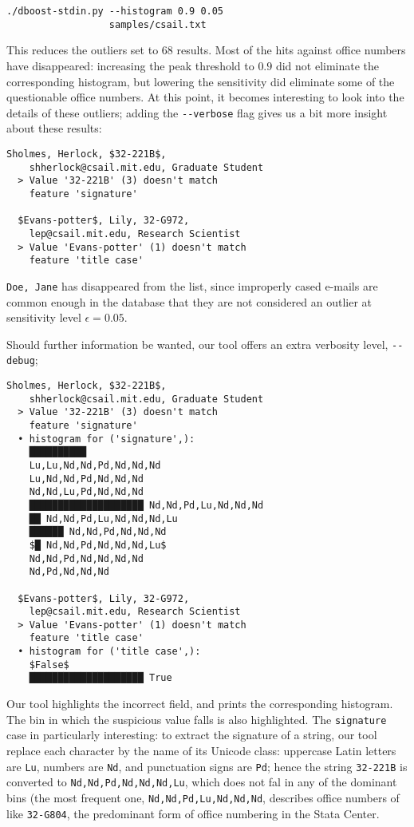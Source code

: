 \begin{lstlisting}[gobble=2]
./dboost-stdin.py --histogram 0.9 0.05 
                  samples/csail.txt
\end{lstlisting}

This reduces the outliers set to $68$ results. Most of the hits against office numbers have disappeared: increasing the peak threshold to $0.9$ did not eliminate the corresponding histogram, but lowering the sensitivity did eliminate some of the questionable office numbers. At this point, it becomes interesting to look into the details of these outliers; adding the \lstinline{--verbose} flag gives us a bit more insight about these results:

\begin{lstlisting}[gobble=2]
  Sholmes, Herlock, $32-221B$, 
    shherlock@csail.mit.edu, Graduate Student
  > Value '32-221B' (3) doesn't match 
    feature 'signature'
 
  $Evans-potter$, Lily, 32-G972, 
    lep@csail.mit.edu, Research Scientist
  > Value 'Evans-potter' (1) doesn't match 
    feature 'title case'  
\end{lstlisting}

\lstinline{Doe, Jane} has disappeared from the list, since improperly cased e-mails are common enough in the database that they are not considered an outlier at sensitivity level $\epsilon = 0.05$.
 
Should further information be wanted, our tool offers an extra verbosity level, \lstinline{--debug};

\begin{lstlisting}[gobble=2]
  Sholmes, Herlock, $32-221B$, 
    shherlock@csail.mit.edu, Graduate Student
  > Value '32-221B' (3) doesn't match 
    feature 'signature'
  • histogram for ('signature',):
    ██████████ 
    Lu,Lu,Nd,Nd,Pd,Nd,Nd,Nd
    Lu,Nd,Nd,Pd,Nd,Nd,Nd
    Nd,Nd,Lu,Pd,Nd,Nd,Nd
    ████████████████████ Nd,Nd,Pd,Lu,Nd,Nd,Nd
    ██ Nd,Nd,Pd,Lu,Nd,Nd,Nd,Lu
    ██████ Nd,Nd,Pd,Nd,Nd,Nd
    $█ Nd,Nd,Pd,Nd,Nd,Nd,Lu$
    Nd,Nd,Pd,Nd,Nd,Nd,Nd
    Nd,Pd,Nd,Nd,Nd

  $Evans-potter$, Lily, 32-G972, 
    lep@csail.mit.edu, Research Scientist
  > Value 'Evans-potter' (1) doesn't match 
    feature 'title case'  
  • histogram for ('title case',):
    $False$
    ████████████████████ True
\end{lstlisting}

Our tool highlights the incorrect field, and prints the corresponding histogram. The bin in which the suspicious value falls is also highlighted. The \lstinline{signature} case in particularly interesting: to extract the signature of a string, our tool replace each character by the name of its Unicode class: uppercase Latin letters are \lstinline{Lu}, numbers are \lstinline{Nd}, and punctuation signs are \lstinline{Pd}; hence the string \lstinline{32-221B} is converted to \lstinline{Nd,Nd,Pd,Nd,Nd,Nd,Lu}, which does not fal in any of the dominant bins (the most frequent one, \lstinline{Nd,Nd,Pd,Lu,Nd,Nd,Nd}, describes office numbers of like \lstinline{32-G804}, the predominant form of office numbering in the Stata Center.  

